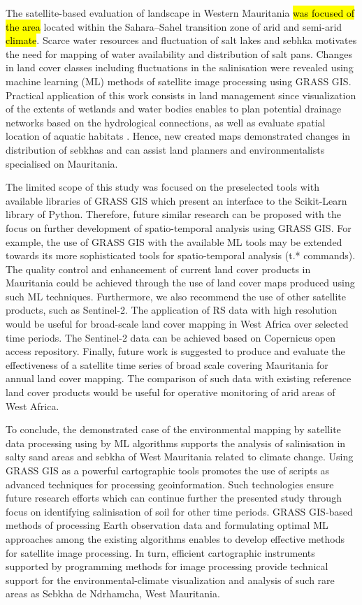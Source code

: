 \documentclass[12pt,a4paper,oneside]{article}
\def \newpar{\vspace{6pt}}
\begin{document}
\newpar The\hl{ }satellite-based evaluation of landscape in Western Mauritania \hl{was focused of the area} located within the Sahara–Sahel transition zone of arid and semi-arid \hl{climate}. Scarce water resources and fluctuation of salt lakes and sebhka motivates the need for mapping of water availability and distribution of salt pans. Changes in land cover classes including fluctuations in the salinisation were revealed using machine learning (ML) methods of satellite image processing using GRASS GIS. Practical application of this work consists in land management since visualization of the extents of wetlands and water bodies enables to plan potential drainage networks based on the hydrological connections, as well as evaluate spatial location of aquatic habitats \cite{CAMPOS2012438}. Hence, new created maps demonstrated changes in distribution of sebkhas and can assist land planners and environmentalists specialised on Mauritania.

\newpar The limited scope of this study was focused on the preselected tools with available libraries of GRASS GIS which present an interface to the Scikit-Learn library of Python. Therefore, future similar research can be proposed with the focus on further development of spatio-temporal analysis using GRASS GIS. For example, the use of GRASS GIS with the available ML tools may be extended towards its more sophisticated tools for spatio-temporal analysis (t.* commands). The quality control and enhancement of current land cover products in Mauritania could be achieved through the use of land cover maps produced using such ML techniques. Furthermore, we also recommend the use of other satellite products, such as Sentinel-2. The application of RS data with high resolution would be useful for broad-scale land cover mapping in West Africa over selected time periods. The Sentinel-2 data can be achieved based on Copernicus open access repository. Finally, future work is suggested to produce and evaluate the effectiveness of a satellite time series of broad scale covering Mauritania for annual land cover mapping. The comparison of such data with existing reference land cover products would be useful for operative monitoring of arid areas of West Africa.

\newpar To conclude, the demonstrated case of the environmental mapping by satellite data processing using by ML algorithms supports the analysis of salinisation in salty sand areas and sebkha of West Mauritania related to climate change. Using GRASS GIS as a powerful cartographic tools promotes the use of scripts as advanced techniques for processing geoinformation. Such  technologies ensure future research efforts which can continue further the presented study through focus on identifying salinisation of soil for other time periods. GRASS GIS-based methods of processing Earth observation data and formulating optimal ML approaches among the existing algorithms enables to develop effective methods for satellite image processing. In turn, efficient cartographic instruments supported by programming methods for image processing provide technical support for the environmental-climate visualization and analysis of such rare areas as Sebkha de Ndrhamcha, West Mauritania. 
\end{document}
